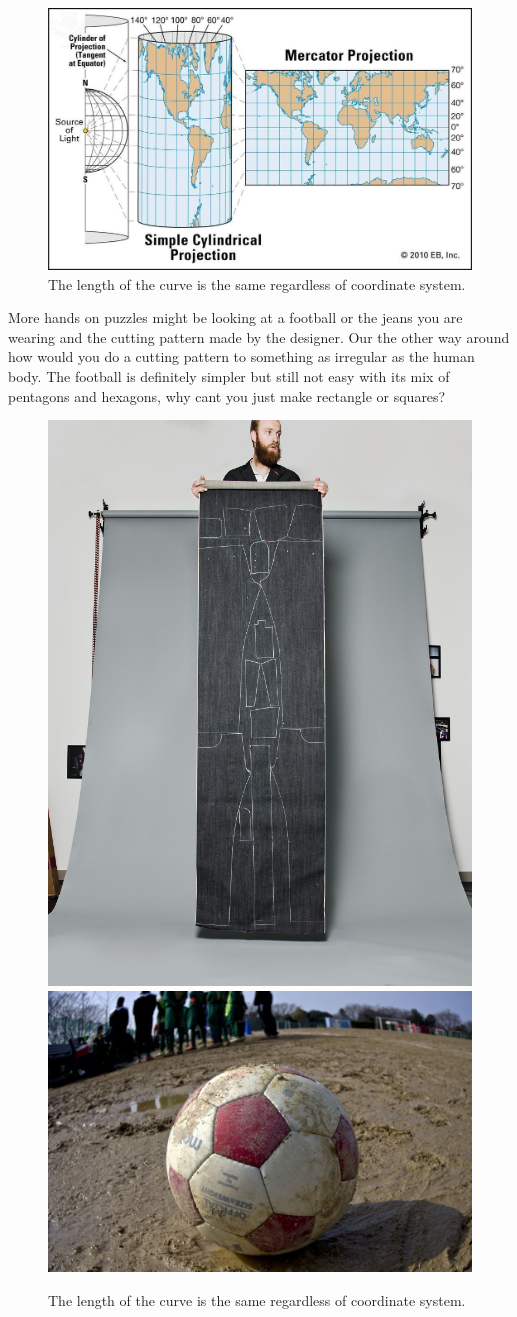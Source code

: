 \begin{figure}[H]
\centering
\includegraphics[width=0.9\linewidth ]{figure/Introduction/Mercator.jpg}

\caption{The length of the curve is the same regardless of coordinate system.}
\end{figure}

More hands on puzzles might be looking at a football or the jeans you are wearing and the cutting pattern made by the designer. Our the other way around how would you do a cutting pattern to something as irregular as the human body. The football is definitely simpler but still not easy with its mix of pentagons and hexagons, why cant you just make rectangle or squares?

\begin{figure}[H]
\centering
\includegraphics[height=0.4\linewidth ]{figure/Introduction/Jeans.jpg}
\includegraphics[height=0.4\linewidth ]{figure/Introduction/football.jpg}
\caption{The length of the curve is the same regardless of coordinate system.}
\end{figure}


